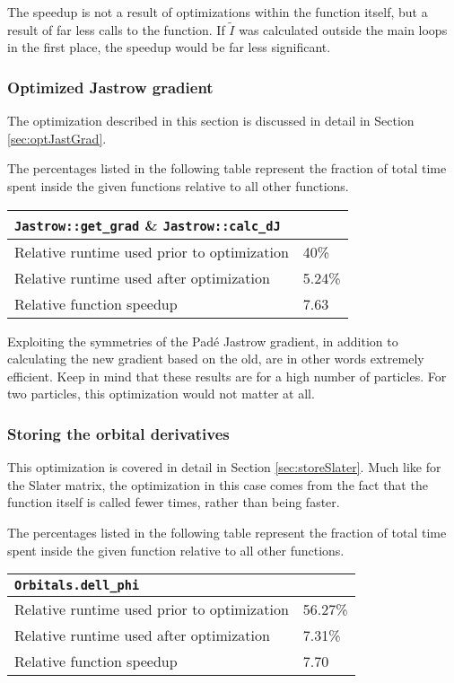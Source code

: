 The speedup is not a result of optimizations within the function itself, but a result of far less calls to the function. If $\tilde I$ was calculated outside the main loops in the first place, the speedup would be far less significant. 


\subsubsection{Optimized Jastrow gradient}

The optimization described in this section is discussed in detail in Section \ref{sec:optJastGrad}.

The percentages listed in the following table represent the fraction of total time spent inside the given functions relative to all other functions. 

\begin{tabular}{ll}
 \verb+Jastrow::get_grad+ \& \verb+Jastrow::calc_dJ+ & \\
 \hline\hline
 Relative runtime used prior to optimization & 40\% \\
 Relative runtime used after optimization    & 5.24\% \\
 \hline
 Relative function speedup                   & 7.63
\end{tabular}

Exploiting the symmetries of the Padé Jastrow gradient, in addition to calculating the new gradient based on the old, are in other words extremely efficient. Keep in mind that these results are for a high number of particles. For two particles, this optimization would not matter at all.

\subsubsection{Storing the orbital derivatives}

This optimization is covered in detail in Section \ref{sec:storeSlater}. Much like for the Slater matrix, the optimization in this case comes from the fact that the function itself is called fewer times, rather than being faster.

The percentages listed in the following table represent the fraction of total time spent inside the given function relative to all other functions. 


\begin{tabular}{ll}
 \verb+Orbitals.dell_phi+ & \\
 \hline\hline
 Relative runtime used prior to optimization & 56.27\% \\
 Relative runtime used after optimization    & 7.31\% \\
 \hline
 Relative function speedup                   & 7.70
\end{tabular}


